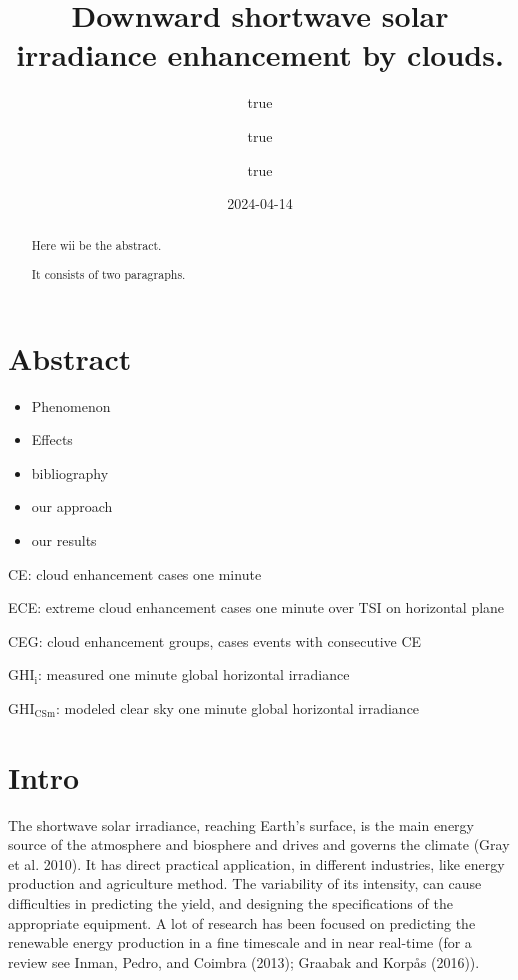 \documentclass[
  preprint, 3p, authoryear]{article}
\title{Downward shortwave solar irradiance enhancement by clouds.}
\author{true \and true \and true}
\date{2024-04-14}
\providecommand{\tightlist}{%
  \setlength{\itemsep}{0pt}\setlength{\parskip}{0pt}}
\begin{document}
\maketitle
\begin{abstract}
Here wii be the abstract.

It consists of two paragraphs.
\end{abstract}

{
\setcounter{tocdepth}{4}
\tableofcontents
}
\hypertarget{abstract}{%
\section*{Abstract}\label{abstract}}

\begin{itemize}
\tightlist
\item
  Phenomenon
\item
  Effects
\item
  bibliography
\item
  our approach
\item
  our results
\end{itemize}

CE: cloud enhancement cases one minute

ECE: extreme cloud enhancement cases one minute over TSI on horizontal plane

CEG: cloud enhancement groups, cases events with consecutive CE

\(\text{GHI}_\text{i}\): measured one minute global horizontal irradiance

\(\text{GHI}_\text{CSm}\): modeled clear sky one minute global horizontal irradiance

\hypertarget{intro}{%
\section{Intro}\label{intro}}

The shortwave solar irradiance, reaching Earth's surface, is the main energy source
of the atmosphere and biosphere and drives and governs the climate (Gray et al. 2010). It
has direct practical application, in different industries, like energy production and
agriculture method. The variability of its intensity, can cause difficulties in
predicting the yield, and designing the specifications of the appropriate equipment.
A lot of research has been focused on predicting the renewable energy production in a
fine timescale and in near real-time (for a review see Inman, Pedro, and Coimbra (2013); Graabak and Korpås (2016)).
\end{document}
